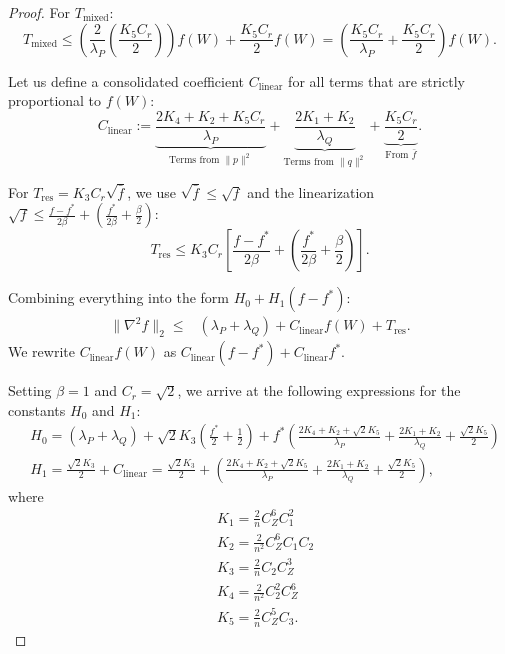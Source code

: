 \documentclass[a4paper,11pt]{article}
\newcommand{\1}{\mathbbm{1}}
\theoremstyle{plain}
\begin{document}
\begin{proof}
For $T_{\text{mixed}}$:
\begin{equation*}
    T_{\text{mixed}} \le \left( \frac{2}{\lambda_P}\left( \frac{K_5 C_r}{2} \right) \right) f(W) + \frac{K_5 C_r}{2} f(W) = \left( \frac{K_5 C_r}{\lambda_P} + \frac{K_5 C_r}{2} \right) f(W).
\end{equation*}

Let us define a consolidated coefficient $C_{\text{linear}}$ for all terms that are strictly proportional to $f(W)$:
\begin{equation*}
    C_{\text{linear}} := \underbrace{\frac{2K_4 + K_2 + K_5 C_r}{\lambda_P}}_{\text{Terms from } \|p\|^2} + \underbrace{\frac{2K_1 + K_2}{\lambda_Q}}_{\text{Terms from } \|q\|^2} + \underbrace{\frac{K_5 C_r}{2}}_{\text{From } \bar{f}}.
\end{equation*}

For $T_{\text{res}} = K_3 C_r \sqrt{\bar{f}}$, we use $\sqrt{\bar{f}} \le \sqrt{f}$ and the linearization $\sqrt{f} \le \frac{f-f^*}{2\beta} + (\frac{f^*}{2\beta} + \frac{\beta}{2})$:
\begin{equation*}
    T_{\text{res}} \le K_3 C_r \left[ \frac{f - f^*}{2\beta} + \left( \frac{f^*}{2\beta} + \frac{\beta}{2} \right) \right].
\end{equation*}

Combining everything into the form $H_0 + H_1(f-f^*)$:
\begin{align*}
    \|\nabla^2 f\|_2 \le {}& (\lambda_P + \lambda_Q)
    + C_{\text{linear}} f(W) + T_{\text{res}}.
\end{align*}
We rewrite $C_{\text{linear}} f(W)$ as $C_{\text{linear}} (f - f^*) + C_{\text{linear}} f^*$.

Setting $\beta=1$ and $C_r = \sqrt{2}$, we arrive at the following expressions for the constants $H_0$ and $H_1$:
\begin{align}
\label{eq:global_constants_transformer}
& \nonumber H_0 = (\lambda_P + \lambda_Q) + \sqrt{2} K_3 \left( \frac{f^*}{2} + \frac{1}{2} \right) + f^* \left( \frac{2K_4 + K_2 + \sqrt{2} K_5}{\lambda_P} + \frac{2K_1 + K_2}{\lambda_Q} + \frac{\sqrt{2} K_5}{2} \right) \\
    &H_1 = \frac{\sqrt{2} K_3}{2} + C_{\text{linear}} = \frac{\sqrt{2} K_3}{2} + \left( \frac{2K_4 + K_2 + \sqrt{2} K_5}{\lambda_P} + \frac{2K_1 + K_2}{\lambda_Q} + \frac{\sqrt{2} K_5}{2} \right),
\end{align}
where
\begin{align*}
&K_1 = \frac{2}{n} C_Z^6 C_1^2 \\
&K_2 = \frac{2}{n^2} C_Z^6 C_1 C_2 \\
&K_3 = \frac{2}{n} C_2 C_Z^3 \\
&K_4 = \frac{2}{n^2} C_2^2 C_Z^6 \\
&K_5 = \frac{2}{n} C_Z^5 C_3.
\end{align*}

\end{proof}
\end{document}
